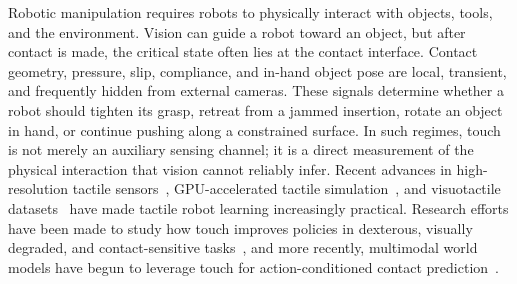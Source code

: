 \documentclass{article}
\begin{document}
Robotic manipulation requires robots to physically interact with objects, tools, and the environment. Vision can guide a robot toward an object, but after contact is made, the critical state often lies at the contact interface. Contact geometry, pressure, slip, compliance, and in-hand object pose are local, transient, and frequently hidden from external cameras. These signals determine whether a robot should tighten its grasp, retreat from a jammed insertion, rotate an object in hand, or continue pushing along a constrained surface. In such regimes, touch is not merely an auxiliary sensing channel; it is a direct measurement of the physical interaction that vision cannot reliably infer.
Recent advances in high-resolution tactile sensors~\citep{yuan2017gelsight,lambeta2020digit}, GPU-accelerated tactile simulation~\citep{wang2022tacto,si2022taxim,akinola2024tacsl}, and visuotactile datasets~\citep{higuera2024sparsh,liu2025vtdexmanip,xu2025manifeel} have made tactile robot learning increasingly practical. Research efforts have been made to study how touch improves policies in dexterous, visually degraded, and contact-sensitive tasks~\citep{higuera2024sparsh,liu2025vtdexmanip,xu2025manifeel}, and more recently, multimodal world models have begun to leverage touch for action-conditioned contact prediction~\citep{higuera2026visuo}.

\end{document}
